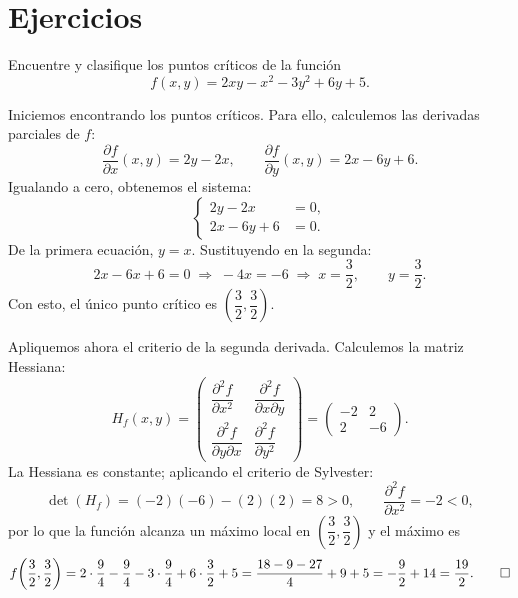\documentclass[10pt,a5]{aleph-examen}
\begin{document}
\encabezado



\section*{Ejercicios}

\begin{preguntas}

\item
Encuentre y clasifique los puntos críticos de la función
\[
    f(x,y) = 2xy - x^2 - 3y^2 + 6y + 5.
\]

\begin{respuesta}
Iniciemos encontrando los puntos críticos. Para ello, calculemos las derivadas parciales de $f$:
\[
    \frac{\partial f}{\partial x}(x,y) = 2y - 2x,
    \qquad
    \frac{\partial f}{\partial y}(x,y) = 2x - 6y + 6.
\]
Igualando a cero, obtenemos el sistema:
\[
    \left\{
    \begin{aligned}
        2y - 2x &= 0,\\
        2x - 6y + 6 &= 0.
    \end{aligned}
    \right.
\]
De la primera ecuación, $y = x$. Sustituyendo en la segunda:
\[
    2x - 6x + 6 = 0
    \;\Longrightarrow\;
    -4x = -6
    \;\Longrightarrow\;
    x = \frac{3}{2},
    \qquad
    y = \frac{3}{2}.
\]
Con esto, el único punto crítico es $\left(\dfrac{3}{2},\dfrac{3}{2}\right)$.

Apliquemos ahora el criterio de la segunda derivada. Calculemos la matriz Hessiana:
\[
    H_f(x,y)
    =
    \begin{pmatrix}
        \dfrac{\partial^2 f}{\partial x^2} & \dfrac{\partial^2 f}{\partial x\partial y}\\[10pt]
        \dfrac{\partial^2 f}{\partial y\partial x} & \dfrac{\partial^2 f}{\partial y^2}
    \end{pmatrix}
    =
    \begin{pmatrix}
        -2 & 2\\
        2 & -6
    \end{pmatrix}.
\]
La Hessiana es constante; aplicando el criterio de Sylvester:
\[
    \det(H_f) = (-2)(-6) - (2)(2) = 8 > 0,
    \qquad
    \frac{\partial^2 f}{\partial x^2} = -2 < 0,
\]
por lo que la función alcanza un {máximo} local en $\left(\dfrac{3}{2},\dfrac{3}{2}\right)$ y el máximo es
\[
    f\!\left(\frac{3}{2},\frac{3}{2}\right)
    = 2\cdot\frac{9}{4} - \frac{9}{4} - 3\cdot\frac{9}{4} + 6\cdot\frac{3}{2} + 5
    = \frac{18-9-27}{4} + 9 + 5
    = -\frac{9}{2} + 14
    = \frac{19}{2}.\qedhere
\]
\end{respuesta}



\end{preguntas}
\end{document}
